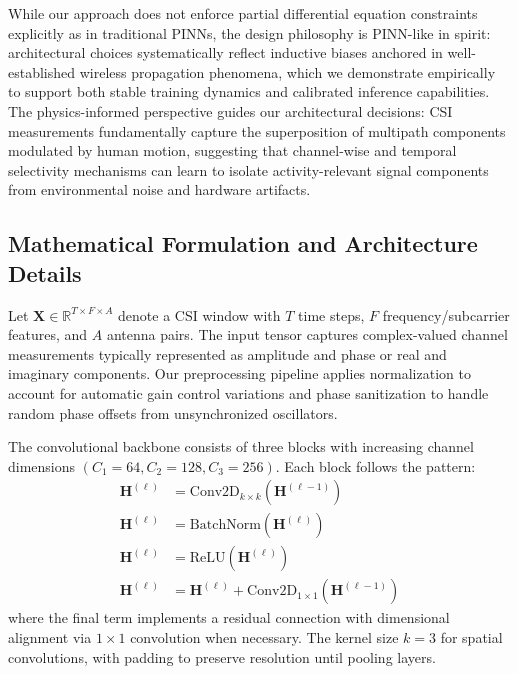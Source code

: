 \documentclass[journal]{IEEEtran}
\begin{document}
While our approach does not enforce partial differential equation constraints explicitly as in traditional PINNs, the design philosophy is PINN-like in spirit: architectural choices systematically reflect inductive biases anchored in well-established wireless propagation phenomena, which we demonstrate empirically to support both stable training dynamics and calibrated inference capabilities. The physics-informed perspective guides our architectural decisions: CSI measurements fundamentally capture the superposition of multipath components modulated by human motion, suggesting that channel-wise and temporal selectivity mechanisms can learn to isolate activity-relevant signal components from environmental noise and hardware artifacts.

\subsection{Mathematical Formulation and Architecture Details}

Let $\mathbf{X}\in \mathbb{R}^{T\times F\times A}$ denote a CSI window with $T$ time steps, $F$ frequency/subcarrier features, and $A$ antenna pairs. The input tensor captures complex-valued channel measurements typically represented as amplitude and phase or real and imaginary components. Our preprocessing pipeline applies normalization to account for automatic gain control variations and phase sanitization to handle random phase offsets from unsynchronized oscillators.

The convolutional backbone consists of three blocks with increasing channel dimensions $(C_1{=}64, C_2{=}128, C_3{=}256)$. Each block follows the pattern:
\begin{align}
\mathbf{H}^{(\ell)} &= \mathrm{Conv2D}_{k\times k}(\mathbf{H}^{(\ell-1)}) \\
\mathbf{H}^{(\ell)} &= \mathrm{BatchNorm}(\mathbf{H}^{(\ell)}) \\
\mathbf{H}^{(\ell)} &= \mathrm{ReLU}(\mathbf{H}^{(\ell)}) \\
\mathbf{H}^{(\ell)} &= \mathbf{H}^{(\ell)} + \mathrm{Conv2D}_{1\times 1}(\mathbf{H}^{(\ell-1)})
\end{align}
where the final term implements a residual connection with dimensional alignment via $1{\times}1$ convolution when necessary. The kernel size $k{=}3$ for spatial convolutions, with padding to preserve resolution until pooling layers.
\end{document}
